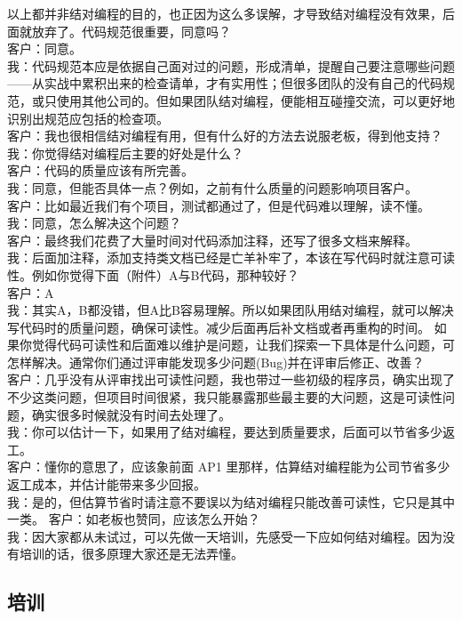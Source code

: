 以上都并非结对编程的目的，也正因为这么多误解，才导致结对编程没有效果，后面就放弃了。代码规范很重要，同意吗？\\
客户：同意。\\
我：代码规范本应是依据自己面对过的问题，形成清单，提醒自己要注意哪些问题------从实战中累积出来的检查请单，才有实用性；但很多团队的没有自己的代码规范，或只使用其他公司的。但如果团队结对编程，便能相互碰撞交流，可以更好地识别出规范应包括的检查项。\\
客户：我也很相信结对编程有用，但有什么好的方法去说服老板，得到他支持？\\
我：你觉得结对编程后主要的好处是什么？\\
客户：代码的质量应该有所完善。\\
我：同意，但能否具体一点？例如，之前有什么质量的问题影响项目客户。\\
客户：比如最近我们有个项目，测试都通过了，但是代码难以理解，读不懂。\\
我：同意，怎么解决这个问题？\\
客户：最终我们花费了大量时间对代码添加注释，还写了很多文档来解释。\\
我：后面加注释，添加支持类文档已经是亡羊补牢了，本该在写代码时就注意可读性。例如你觉得下面（附件）A与B代码，那种较好？\\
客户：A\\
我：其实A，B都没错，但A比B容易理解。所以如果团队用结对编程，就可以解决写代码时的质量问题，确保可读性。减少后面再后补文档或者再重构的时间。
如果你觉得代码可读性和后面难以维护是问题，让我们探索一下具体是什么问题，可怎样解决。通常你们通过评审能发现多少问题(Bug)并在评审后修正、改善？\\
客户：几乎没有从评审找出可读性问题，我也带过一些初级的程序员，确实出现了不少这类问题，但项目时间很紧，我只能暴露那些最主要的大问题，这是可读性问题，确实很多时候就没有时间去处理了。\\
我：你可以估计一下，如果用了结对编程，要达到质量要求，后面可以节省多少返工。\\
客户：懂你的意思了，应该象前面 AP1
里那样，估算结对编程能为公司节省多少返工成本，并估计能带来多少回报。\\
我：是的，但估算节省时请注意不要误以为结对编程只能改善可读性，它只是其中一类。
客户：如老板也赞同，应该怎么开始？\\
我：因大家都从未试过，可以先做一天培训，先感受一下应如何结对编程。因为没有培训的话，很多原理大家还是无法弄懂。\\

\hypertarget{ux57f9ux8bad}{%
\subsection{培训}\label{ux57f9ux8bad}}

